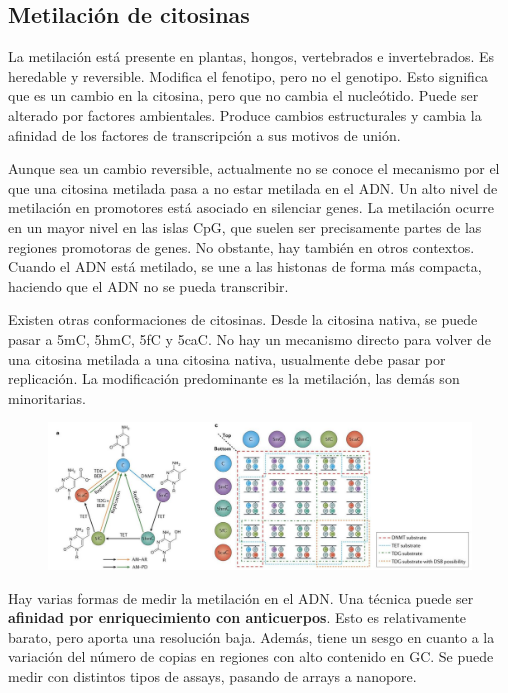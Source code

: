\subsection{Metilación de citosinas}
La metilación está presente en plantas, hongos, vertebrados e invertebrados. Es heredable y reversible. 
Modifica el fenotipo, pero no el genotipo. Esto significa que es un cambio en la citosina, pero que no cambia el nucleótido. Puede ser alterado por factores ambientales. 
Produce cambios estructurales y cambia la afinidad de los factores de transcripción a sus motivos de unión. 

Aunque sea un cambio reversible, actualmente no se conoce el mecanismo por el que una citosina metilada pasa a no estar metilada en el ADN. Un alto nivel de metilación en promotores está asociado en silenciar genes. La metilación ocurre en un mayor nivel en las islas CpG, que suelen ser precisamente partes de las regiones promotoras de genes. No obstante, hay también en otros contextos. Cuando el ADN está metilado, se une a las histonas de forma más compacta, haciendo que el ADN no se pueda transcribir. 

Existen otras conformaciones de citosinas. Desde la citosina nativa, se puede pasar a 5mC, 5hmC, 5fC y 5caC. No hay un mecanismo directo para volver de una citosina metilada a una citosina nativa, usualmente debe pasar por replicación. La modificación predominante es la metilación, las demás son minoritarias.

\begin{figure}[h]
\centering
\includegraphics[width = \textwidth]{figs/5mC.png}
\end{figure}

Hay varias formas de medir la metilación en el ADN. Una técnica puede ser \textbf{afinidad por enriquecimiento con anticuerpos}. Esto es relativamente barato, pero aporta una resolución baja. Además, tiene un sesgo en cuanto a la variación del número de copias en regiones con alto contenido en GC. Se puede medir con distintos tipos de assays, pasando de arrays a nanopore. 

